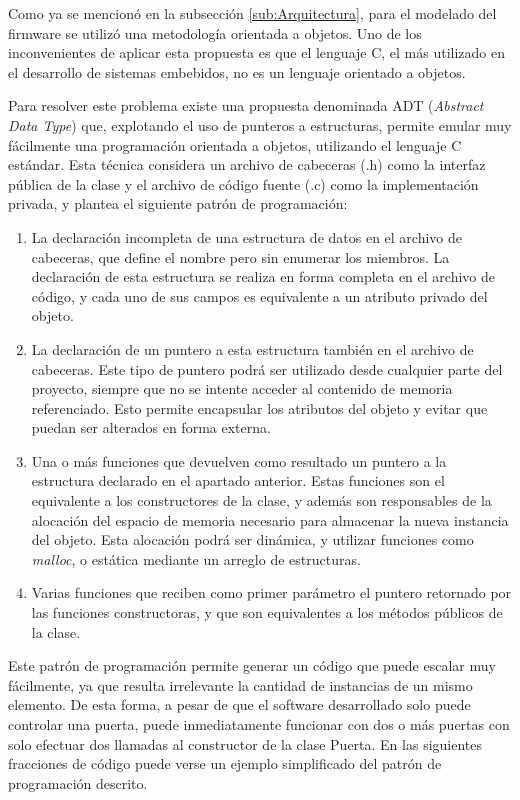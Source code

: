 Como ya se mencionó en la subsección \ref{sub:Arquitectura}, para el modelado del firmware se utilizó una metodología orientada a objetos. Uno de los inconvenientes de aplicar esta propuesta es que el lenguaje C, el más utilizado en el desarrollo de sistemas embebidos, no es un lenguaje orientado a objetos.

Para resolver este problema existe una propuesta denominada ADT (\emph{Abstract Data Type})\cite{noauthor_tipo_2020}\cite{grenning_test-driven_2012} que, explotando el uso de punteros a estructuras, permite emular muy fácilmente una programación orientada a objetos, utilizando el lenguaje C estándar. Esta técnica considera un archivo de cabeceras (.h) como la interfaz pública de la clase y el archivo de código fuente (.c) como la implementación privada, y  plantea el siguiente patrón de programación:

\begin{enumerate}
	\item La declaración incompleta de una estructura de datos en el archivo de cabeceras, que define el nombre pero sin enumerar los miembros. La declaración de esta estructura se realiza en forma completa en el archivo de código, y cada uno de sus campos es equivalente a un atributo privado del objeto.
	
	\item La declaración de un puntero a esta estructura también en el archivo de cabeceras. Este tipo de puntero podrá ser utilizado desde cualquier parte del proyecto, siempre que no se intente acceder al contenido de memoria referenciado. Esto permite encapsular los atributos del objeto y evitar que puedan ser alterados en forma externa.
	 
	\item Una o más funciones que devuelven como resultado un puntero a la estructura declarado en el apartado anterior. Estas funciones son el equivalente a los constructores de la clase, y además son responsables de la alocación del espacio de memoria necesario para almacenar la nueva instancia del objeto. Esta alocación podrá ser dinámica, y utilizar funciones como \emph{malloc}, o estática mediante un arreglo de estructuras.
	
	\item Varias funciones que reciben como primer parámetro el puntero retornado por las funciones constructoras, y que son equivalentes a los métodos públicos de la clase. 
\end{enumerate}

Este patrón de programación permite generar un código que puede escalar muy fácilmente, ya que resulta irrelevante la cantidad de instancias de un mismo elemento. De esta forma, a pesar de que el software desarrollado solo puede controlar una puerta, puede inmediatamente funcionar con dos o más puertas con solo efectuar dos llamadas al constructor de la clase Puerta. En las siguientes fracciones de código puede verse un ejemplo simplificado del patrón de programación descrito.

